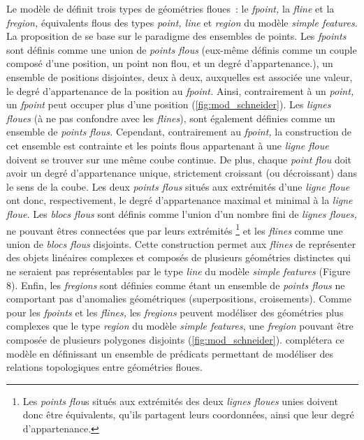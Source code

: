 Le modèle de \textcite{Schneider1999} définit trois types de
géométries floues : le \emph{fpoint,} la \emph{fline} et la
\emph{fregion,} équivalents flous des types \emph{point, line} et
\emph{region} du modèle \emph{simple features.} La proposition de
\textcite{Schneider1999} se base sur le paradigme des ensembles de
points. Les \emph{fpoints} sont définis comme une union de
\emph{points flous} (eux-même définis comme un couple composé d’une
position, \ie un point non flou, et un degré d’appartenance.), \ie un
ensemble de positions disjointes, deux à deux, auxquelles est associée
une valeur, le degré d’appartenance de la position au \emph{fpoint.}
Ainsi, contrairement à un \emph{point,} un \emph{fpoint} peut occuper
plus d’une position (\autoref{fig:mod_schneider}). Les \emph{lignes
  floues} (à ne pas confondre avec les \emph{flines}), sont également
définies comme un ensemble de \emph{points flous.} Cependant,
contrairement au \emph{fpoint,} la construction de cet ensemble est
contrainte et les points flous appartenant à une \emph{ligne floue}
doivent se trouver sur une même coube continue. De plus, chaque
\emph{point flou} doit avoir un degré d’appartenance unique,
strictement croissant (ou décroissant) dans le sens de la coube. Les
deux \emph{points flous} situés aux extrémités d’une \emph{ligne
  floue} ont donc, respectivement, le degré d’appartenance maximal et
minimal à la \emph{ligne floue.} Les \emph{blocs flous} sont définis
comme l’union d’un nombre fini de \emph{lignes floues,} ne pouvant
êtres connectées que par leurs extrémités \footnote{Les \emph{points
    flou}s situés aux extrémités des deux \emph{lignes floues} unies
  doivent donc être équivalents, \ie qu’ils partagent leurs
  coordonnées, ainsi que leur degré d’appartenance.} et les
\emph{flines} comme une union de \emph{blocs flous} disjoints. Cette
construction permet aux \emph{flines} de représenter des objets
linéaires complexes et composés de plusieurs géométries distinctes qui
ne seraient pas représentables par le type \emph{line} du modèle
\emph{simple features} (Figure 8). Enfin, les \emph{fregions} sont
définies comme étant un ensemble de \emph{points flous} ne comportant
pas d’anomalies géométriques (\eg superpositions, croisements). Comme
pour les \emph{fpoints} et les \emph{flines,} les \emph{fregions}
peuvent modéliser des géométries plus complexes que le type
\emph{region} du modèle \emph{simple features}, une \emph{fregion}
pouvant être composée de plusieurs polygones disjoints
(\autoref{fig:mod_schneider}). \textcite{Schneider2004} complétera ce
modèle en définissant un ensemble de prédicats permettant de modéliser
des relations topologiques entre géométries floues.

